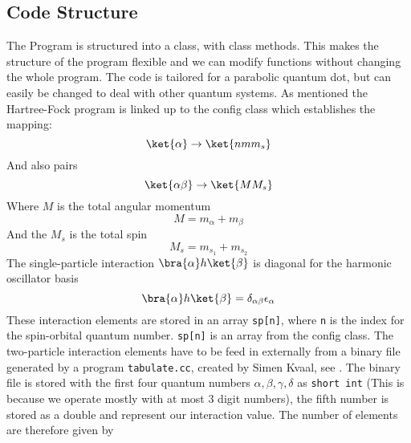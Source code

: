 \subsection{Code Structure}
The Program is structured into a class, with class methods. This makes the structure of the program flexible and we can modify functions without changing the whole program. The code is tailored for a parabolic quantum dot, but can easily be changed to deal with other quantum systems. As mentioned the Hartree-Fock program is linked up to the config class which establishes the mapping:
\begin{equation}
  \ket{\alpha} \rightarrow \ket{n m m_s}
\end{equation}
And also pairs 
\begin{equation}
  \ket{\alpha \beta} \rightarrow \ket{M M_s}
\end{equation}
Where $M$ is the total angular momentum 
\begin{equation}
M = m_\alpha + m_\beta
  \label{totalmomentum}
\end{equation}
And the $M_s$ is the total spin
\begin{equation}
M_s = m_{s_1} + m_{s_2} 
  \label{spin}
\end{equation}
The single-particle interaction $\bra{\alpha}h\ket{\beta}$ is diagonal for the harmonic oscillator basis
\begin{equation}
\bra{\alpha}h\ket{\beta} = \delta_{\alpha \beta} \epsilon_\alpha
\end{equation}
%
These interaction elements are stored in an array \texttt{sp[n]}, where \texttt{n} is the index for the spin-orbital quantum number. \texttt{sp[n]} is an array from the config class. The two-particle interaction elements have to be feed in externally from a binary file generated by a program \texttt{tabulate.cc}, created by Simen Kvaal, see \cite{Kvaal2009}. The binary file is stored with the first four quantum numbers $\alpha,\beta,\gamma,\delta$ as \texttt{short int} (This is because we operate mostly with at most 3 digit numbers), the fifth number is stored as a double and represent our interaction value. The number of elements are therefore given by 

